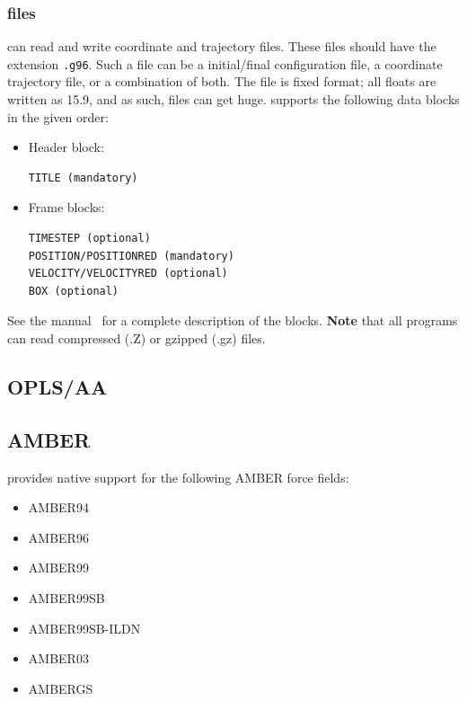 \subsubsection{ files}
{\gromacs} can read and write  coordinate and trajectory files.
These files should have the extension {\tt .g96}.
Such a file can be a  initial/final
configuration file, a coordinate trajectory file, or a combination of both.
The file is fixed format; all floats are written as 15.9, and as such, files can get huge.
{\gromacs} supports the following data blocks in the given order:
\begin{itemize}
\item Header block:
\begin{verbatim}
TITLE (mandatory)
\end{verbatim}

\item Frame blocks:
\begin{verbatim}
TIMESTEP (optional)
POSITION/POSITIONRED (mandatory)
VELOCITY/VELOCITYRED (optional)
BOX (optional)
\end{verbatim}

\end{itemize}
See the  manual~\cite{gromos96} for a complete description
of the blocks. {\bf Note} that all {\gromacs} programs can read compressed
(.Z) or gzipped (.gz) files.

\subsection{OPLS/AA}

\subsection{AMBER}

{\gromacs} provides native support for the following AMBER force fields:

\begin{itemize}
\item AMBER94~\cite{Cornell1995}
\item AMBER96~\cite{Kollman1996}
\item AMBER99~\cite{Wang2000}
\item AMBER99SB~\cite{Hornak2006}
\item AMBER99SB-ILDN~\cite{Lindorff2010}
\item AMBER03~\cite{Duan2003}
\item AMBERGS~\cite{Garcia2002}
\end{itemize}

